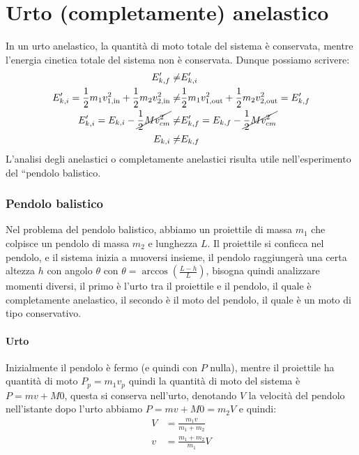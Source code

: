 \section{Urto (completamente) anelastico}
    In un urto anelastico, la quantità di moto totale del sistema è conservata, mentre l'energia cinetica totale del sistema non è conservata. Dunque possiamo scrivere:
    \begin{align*}
        E_{k,f}' \neq & E_{k,i}'\\
        E_{k,i}' = \frac{1}{2}m_1v_{1,\text{in}}^2 + \frac{1}{2}m_2v_{2,\text{in}}^2 \neq & \frac{1}{2}m_1v_{1,\text{out}}^2 + \frac{1}{2}m_2v_{2,\text{out}}^2 = E_{k,f}'\\
        E_{k,i}' = E_{k,i} - \cancel{\frac{1}{2}M v_{cm}^2} \neq & E_{k,f}' = E_{k,f} - \cancel{\frac{1}{2}M v_{cm}^2}\\
        E_{k,i} \neq & E_{k,f}\\
    \end{align*}
    L'analisi degli anelastici o completamente anelastici risulta utile nell'esperimento del ``pendolo balistico.
    \subsubsection{Pendolo balistico}
        Nel problema del pendolo balistico, abbiamo un proiettile di massa $m_1$ che colpisce un pendolo di massa $m_2$ e lunghezza $L$. Il proiettile si conficca nel pendolo, e il sistema inizia a muoversi insieme, il pendolo raggiungerà una certa altezza $h$ con angolo $\theta$ con $\theta = \arccos\left(\frac{L-h}{L}\right)$, bisogna quindi analizzare momenti diversi, il primo è l'urto tra il proiettile e il pendolo, il quale è completamente anelastico, il secondo è il moto del pendolo, il quale è un moto di tipo conservativo.
        \paragraph{Urto} Inizialmente il pendolo è fermo (e quindi con $P$ nulla), mentre il proiettile ha quantità di moto $P_{p} = m_1v_{p}$ quindi la quantità di moto del sistema è $P=mv+M\mathcal{0}$, questa si conserva nell'urto, denotando $V$ la velocità del pendolo nell'istante dopo l'urto abbiamo $P=mv+M\mathcal{0}=m_2V$ e quindi:
        \begin{align*}
            V&=\frac{m_1v}{m_1+m_2}\\
            v&=\frac{m_1+m_2}{m_1}V\\
        \end{align*}
